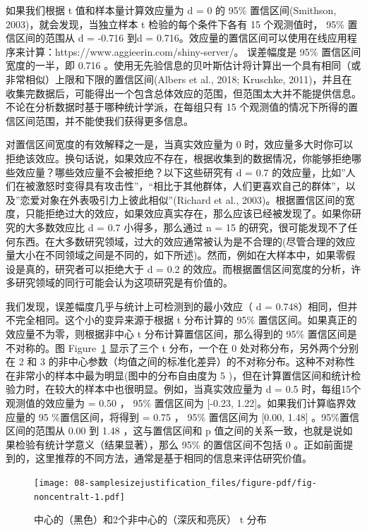 \documentclass[
  letterpaper,
  DIV=11,
  numbers=noendperiod]{scrreprt}
\begin{document}
如果我们根据 t 值和样本量计算效应量为 d = 0 的 95\% 置信区间(Smithson,
2003)，就会发现，当独立样本 t 检验的每个条件下各有 15 个观测值时， 95\%
置信区间的范围从 d = -0.716 到d =
0.716。效应量的置信区间可以使用在线应用程序来计算：https://www.aggieerin.com/shiny-server/。
误差幅度是 95\% 置信区间宽度的一半，即 0.716
。使用无先验信息的贝叶斯估计将计算出一个具有相同（或非常相似）上限和下限的置信区间(Albers
et al., 2018; Kruschke,
2011)，并且在收集完数据后，可能得出一个包含总体效应的范围，但范围太大并不能提供信息。不论在分析数据时基于哪种统计学派，在每组只有
15 个观测值的情况下所得的置信区间范围，并不能使我们获得更多信息。

对置信区间宽度的有效解释之一是，当真实效应量为 0
时，效应量多大时你可以拒绝该效应。换句话说，如果效应不存在，根据收集到的数据情况，你能够拒绝哪些效应量？哪些效应量不会被拒绝？以下这些研究有
d = 0.7
的效应量，比如''人们在被激怒时变得具有攻击性''，``相比于其他群体，人们更喜欢自己的群体''，以及''恋爱对象在外表吸引力上彼此相似''(Richard
et al.,
2003)。根据置信区间的宽度，只能拒绝过大的效应，如果效应真实存在，那么应该已经被发现了。如果你研究的大多数效应比
d = 0.7 小得多，那么通过 n = 15
的研究，很可能发现不了任何东西。在大多数研究领域，过大的效应通常被认为是不合理的(尽管合理的效应量大小在不同领域之间是不同的，如下所述)。然而，例如在大样本中，如果零假设是真的，研究者可以拒绝大于
d = 0.2
的效应。而根据置信区间宽度的分析，许多研究领域的同行可能会认为这项研究是有价值的。

我们发现，误差幅度几乎与统计上可检测到的最小效应（ d =
0.748）相同，但并不完全相同。这个小的变异来源于根据 t 分布计算的 95\%
置信区间。如果真正的效应量不为零，则根据非中心 t
分布计算置信区间，那么得到的 95\% 置信区间是不对称的。图
Figure~\ref{fig-noncentralt} 显示了三个 t 分布，一个在 0
处对称分布，另外两个分别在 2 和 3
的非中心参数（均值之间的标准化差异）的不对称分布。这种不对称性在非常小的样本中最为明显(图中的分布自由度为
5
)，但在计算置信区间和统计检验力时，在较大的样本中也很明显。例如，当真实效应量为
d = 0.5 时，每组15个观测值的效应量为 = 0.50 ， 95\% 置信区间为 {[}-0.23,
1.22{]}。如果我们计算临界效应量的 95 \%置信区间，将得到 = 0.75 ， 95\%
置信区间为 {[}0.00, 1.48{]} 。95\%置信区间的范围从 0.00 到 1.48
，这与置信区间和 p
值之间的关系一致，也就是说如果检验有统计学意义（结果显著），那么 95\%
的置信区间不包括 0
。正如前面提到的，这里推荐的不同方法，通常是基于相同的信息来评估研究价值。

\begin{figure}

{\centering \texttt{[image: 08-samplesizejustification\_files/figure-pdf/fig-noncentralt-1.pdf]}

}

\caption{\label{fig-noncentralt}中心的（黑色）和2个非中心的（深灰和亮灰）
t 分布}

\end{figure}
\end{document}
